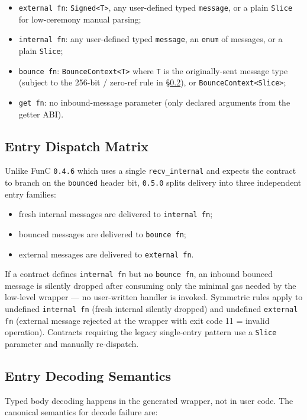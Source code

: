 \documentclass[12pt,oneside]{article}
\begin{document}
\begin{itemize}
\item \verb|external fn|: \verb|Signed<T>|, any user-defined typed
\verb|message|, or a plain \verb|Slice| for low-ceremony manual
parsing;
\item \verb|internal fn|: any user-defined typed \verb|message|, an
\verb|enum| of messages, or a plain \verb|Slice|;
\item \verb|bounce fn|: \verb|BounceContext<T>| where \verb|T| is the
originally-sent message type (subject to the 256-bit / zero-ref
rule in \S\ref{sec:entry-decode}), or \verb|BounceContext<Slice>|;
\item \verb|get fn|: no inbound-message parameter (only declared
arguments from the getter ABI).
\end{itemize}

\subsection{Entry Dispatch Matrix}
\label{sec:entry-dispatch}
Unlike FunC \verb|0.4.6| which uses a single \verb|recv_internal| and
expects the contract to branch on the \verb|bounced| header bit,
\verb|0.5.0| splits delivery into three independent entry families:

\begin{itemize}
\item fresh internal messages are delivered to \verb|internal fn|;
\item bounced messages are delivered to \verb|bounce fn|;
\item external messages are delivered to \verb|external fn|.
\end{itemize}

If a contract defines \verb|internal fn| but no \verb|bounce fn|, an
inbound bounced message is silently dropped after consuming only the
minimal gas needed by the low-level wrapper --- no user-written handler
is invoked. Symmetric rules apply to undefined \verb|internal fn|
(fresh internal silently dropped) and undefined \verb|external fn|
(external message rejected at the wrapper with exit code 11 = invalid
operation). Contracts requiring the legacy single-entry pattern use a
\verb|Slice| parameter and manually re-dispatch.

\subsection{Entry Decoding Semantics}
\label{sec:entry-decode}
Typed body decoding happens in the generated wrapper, not in user code.
The canonical semantics for decode failure are:
\end{document}
